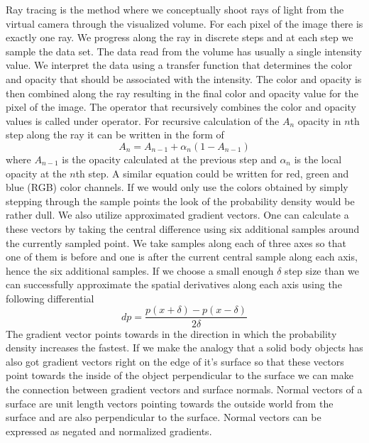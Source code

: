 Ray tracing is the method where we conceptually shoot rays of light from the virtual camera through the visualized volume.
For each pixel of the image there is exactly one ray.
We progress along the ray in discrete steps and at each step we sample the data set.
The data read from the volume has usually a single intensity value.
We interpret the data using a transfer function that determines the color and opacity that should be associated with the intensity.
The color and opacity is then combined along the ray resulting in the final color and opacity value for the pixel of the image.
The operator that recursively combines the color and opacity values is called under operator. For recursive calculation of the $A_n$ opacity in $n$th step along the ray it can be written in the form of
\begin{equation}
	\label{eq:under_op}
	A_n = A_{n-1} + \alpha_n(1 - A_{n-1})
\end{equation}
where $A_{n-1}$ is the opacity calculated at the previous step and $\alpha_n$ is the local opacity at the $n$th step.
A similar equation could be written for red, green and blue (RGB) color channels.
If we would only use the colors obtained by simply stepping through the sample points the look of the probability density would be rather dull.
We also utilize approximated gradient vectors.
One can calculate a these vectors by taking the central difference using six additional samples around the currently sampled point.
We take samples along each of three axes so that one of them is before and one is after the current central sample along each axis, hence the six additional samples.
If we choose a small enough $\delta$ step size than we can successfully approximate the spatial derivatives along each axis using the following differential
\begin{equation}
	\label{eq:central_differential}
	dp = \frac{p(x + \delta) - p(x - \delta)}{2\delta}
\end{equation}
The gradient vector points towards in the direction in which the probability density increases the fastest.
If we make the analogy that a solid body objects has also got gradient vectors right on the edge of it's surface so that these vectors point towards the inside of the object perpendicular to the surface
we can make the connection between gradient vectors and surface normals.
Normal vectors of a surface are unit length vectors pointing towards the outside world from the surface and are also perpendicular to the surface.
Normal vectors can be expressed as negated and normalized gradients.
